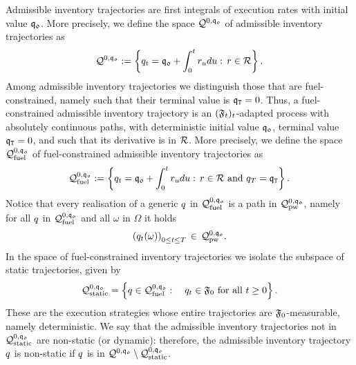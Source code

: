 \documentclass[10pt,a4paper]{article}
\begin{document}
Admissible inventory trajectories are first integrals of execution rates with initial value $\mathfrak{q_0}$. More precisely, we define the space $\mathcal{Q}^{0,\mathfrak{q_0}}$ of admissible inventory trajectories as 
\begin{equation}\label{eq.definitionOfSpaceInventoryTrajectories}
\mathcal{Q}^{0,\mathfrak{q_0}} 
:=
\left\lbrace
q_t=\mathfrak{q_0} + \int_{0}^{t}r_u du: \, r \in \mathcal{R}
\right\rbrace.
\end{equation}
Among admissible inventory trajectories we distinguish those that are fuel-constrained, namely such that their terminal value is $\mathfrak{q}_{\mathtt{T} }=0$. Thus, a fuel-constrained admissible inventory trajectory is an $(\mathfrak{F}_t)_t$-adapted process with absolutely continuous paths, with deterministic initial value $\mathfrak{q_0}$,  terminal value $\mathfrak{q}_{\mathtt{T} }=0$, and such that its derivative is in $\mathcal{R}$.  More precisely, we define the space $\mathcal{Q}_{\text{fuel}}^{0,\mathfrak{q_0}}$ of fuel-constrained admissible inventory trajectories as 
\begin{equation*}
\mathcal{Q}_{\text{fuel}}^{0,\mathfrak{q_0}}:= \left\lbrace
q_t=\mathfrak{q_0} + \int_{0}^{t}r_u du: \, r \in \mathcal{R} \text{ and } q_T = \mathfrak{q}_{\mathtt{T} }
\right\rbrace.
\end{equation*}
Notice that every realisation of a generic $q$ in $\mathcal{Q}_{\text{fuel}}^{0,\mathfrak{q_0}}$ is a path in $\mathcal{Q}^{0,\mathfrak{q_0}}_{\text{pw}}$, namely for all $q$ in $\mathcal{Q}_{\text{fuel}}^{0,\mathfrak{q_0}}$ and all $\omega$ in $\Omega$ it holds
\begin{equation*}
\left(q_t(\omega)\right)_{0\leq t \leq T} \, \in \, \mathcal{Q}^{0,\mathfrak{q_0}}_{\text{pw}}.
\end{equation*}
In the space of fuel-constrained inventory trajectories we isolate the subspace of static trajectories, given by
\begin{equation*}
\mathcal{Q}_{\text{static}}^{0,\mathfrak{q_0}} = 
\left\lbrace q \in \mathcal{Q}_{\text{fuel}}^{0,\mathfrak{q_0}}: \quad 
q_t \in \mathfrak{F}_0 \text{ for all } t \geq 0 \right\rbrace.
\end{equation*}
These are the execution strategies whose entire trajectories are $\mathfrak{F}_0$-measurable, namely deterministic. We say that the admissible inventory trajectories not in $	\mathcal{Q}_{\text{static}}^{0,\mathfrak{q_0}}$ are non-static (or dynamic): therefore, the admissible inventory trajectory $q$ is non-static if $q$ is in  $\mathcal{Q}^{0,\mathfrak{q_0}}\setminus \mathcal{Q}_{\text{static}}^{0,\mathfrak{q_0}}$.
\end{document}
